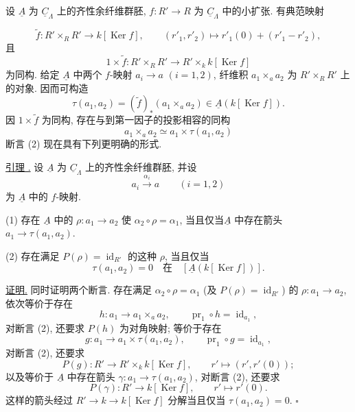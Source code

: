 设 $\underline A$ 为 $\underline C_\Lambda$ 上的齐性余纤维群胚,
$f:R'\longrightarrow R$ 为 $\underline C_\Lambda$ 中的小扩张. 有典范映射


\[
 \widetilde f:R'\times_RR'\longrightarrow k[\operatorname{Ker}f],
 \qquad
 (r'_1,r'_2)\longmapsto r'_1(0)+(r'_1-r'_2),
\]
且
\[
 1\times\widetilde f:R'\times_RR'
 \longrightarrow R'\times_k k[\operatorname{Ker}f]
\]
为同构. 给定 $\underline A$ 中两个 $f$-映射
$a_i\longrightarrow a$ $(i=1,2)$, 纤维积 $a_1\times_a a_2$
为 $R'\times_RR'$ 上的对象. 因而可构造
\[
 \tau(a_1,a_2)=
 (\widetilde f)_*(a_1\times_a a_2)
 \in\underline A(k[\operatorname{Ker}f]).
\]
因 $1\times\widetilde f$ 为同构, 存在与到第一因子的投影相容的同构
\[
 a_1\times_a a_2\simeq a_1\times\tau(a_1,a_2)
\]
断言 (2) 现在具有下列更明确的形式.

\underline{引理 .}
设 $\underline A$ 为 $\underline C_\Lambda$ 上的齐性余纤维群胚,
并设
\[
 a_i\xrightarrow{\ \alpha_i\ }a\qquad(i=1,2)
\]
为 $\underline A$ 中的 $f$-映射.

(1) 存在 $\underline A$ 中的 $\rho:a_1\longrightarrow a_2$
使 $\alpha_2\circ\rho=\alpha_1$, 当且仅当$\underline A$ 中存在箭头
$a_1\longrightarrow\tau(a_1,a_2)$.

(2) 存在满足 $P(\rho)=\operatorname{id}_{R'}$ 的这种 $\rho$, 当且仅当
\[
 \tau(a_1,a_2)=0
 \quad\text{在}\quad
 [\underline A(k[\operatorname{Ker}f])].
\]

\underline{证明.} 同时证明两个断言.
存在满足 $\alpha_2\circ\rho=\alpha_1$
(及 $P(\rho)=\operatorname{id}_{R'}$) 的 $\rho:a_1\longrightarrow a_2$,
依次等价于存在
\[
 h:a_1\longrightarrow a_1\times_a a_2,
 \qquad \operatorname{pr}_1\circ h=\operatorname{id}_{a_1},
\]
对断言 (2), 还要求 $P(h)$ 为对角映射; 等价于存在
\[
 g:a_1\longrightarrow a_1\times\tau(a_1,a_2),
 \qquad \operatorname{pr}_1\circ g=\operatorname{id}_{a_1},
\]
对断言 (2), 还要求
\[
 P(g):R'\longrightarrow R'\times_k k[\operatorname{Ker}f],
 \qquad r'\longmapsto(r',r'(0));
\]
以及等价于 $\underline A$ 中存在箭头
$\gamma:a_1\longrightarrow\tau(a_1,a_2)$, 对断言 (2), 还要求
\[
 P(\gamma):R'\longrightarrow k[\operatorname{Ker}f],
 \qquad r'\longmapsto r'(0).
\]
这样的箭头经过 $R'\longrightarrow k\longrightarrow k[\operatorname{Ker}f]$
分解当且仅当 $\tau(a_1,a_2)=0$. \hfill$\square$

